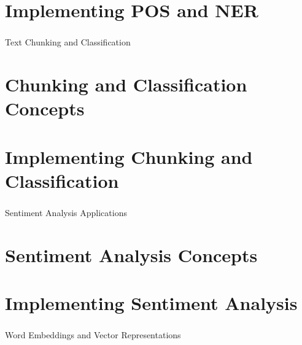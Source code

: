 \section[Day 3 Lab]{Implementing POS and NER}






\begin{frame}[fragile]\frametitle{}
\begin{center}
{\Large Text Chunking and Classification}
\end{center}
\end{frame}

\section[Day 4 Theory]{Chunking and Classification Concepts}




\section[Day 4 Lab]{Implementing Chunking and Classification}




\begin{frame}[fragile]\frametitle{}
\begin{center}
{\Large Sentiment Analysis Applications}
\end{center}
\end{frame}

\section[Day 5 Theory]{Sentiment Analysis Concepts}




\section[Day 5 Lab]{Implementing Sentiment Analysis}



\begin{frame}[fragile]\frametitle{}
\begin{center}
{\Large Word Embeddings and Vector Representations}
\end{center}
\end{frame}

